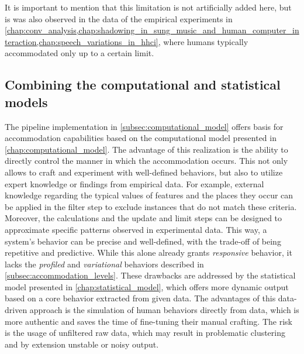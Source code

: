 \noindent
%
It is important to mention that this limitation is not artificially added here, but is was also observed in the data of the empirical experiments in  \cref{chap:conv_analysis,chap:shadowing_in_sung_music_and_human_computer_interaction,chap:speech_variations_in_hhci}, where humans typically accommodated only up to a certain limit.

\subsection{Combining the computational and statistical models}
\label{subsec:comb_comp_stat_models}

The pipeline implementation in \cref{subsec:computational_model} offers basis for accommodation capabilities based on the computational model presented in \cref{chap:computational_model}.
The advantage of this realization is the ability to directly control the manner in which the accommodation occurs.
This not only allows to craft and experiment with well-defined behaviors, but also to utilize expert knowledge or findings from empirical data.
For example, external knowledge regarding the typical values of features and the places they occur can be applied in the filter step to exclude instances that do not match these criteria.
Moreover, the calculations and the update and limit steps can be designed to approximate specific patterns observed in experimental data.
This way, a system's behavior can be precise and well-defined, with the trade-off of being repetitive and predictive.
While this alone already grants \emph{responsive} behavior, it lacks the \emph{profiled} and \emph{variational} behaviors described in \cref{subsec:accommodation_levels}.
These drawbacks are addressed by the statistical model presented in \cref{chap:statistical_model}, which offers more dynamic output based on a core behavior extracted from given data.
The advantages of this data-driven approach is the simulation of human behaviors directly from data, which is more authentic and saves the time of fine-tuning their manual crafting.
The risk is the usage of unfiltered raw data, which may result in problematic clustering and by extension unstable or noisy output.


